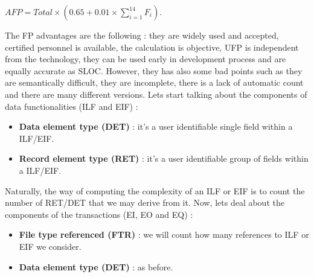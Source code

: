 \begin{center}
    $AFP = Total \times (0.65 + 0.01 \times \sum_{i=1}^{14} F_i)$.
\end{center}
The FP advantages are the following : they are widely used and accepted, certified personnel is available, the calculation is objective, UFP is independent from the technology, they can be used early in development process and are equally accurate as SLOC. However, they has also some bad points such as they are semantically difficult, they are incomplete, there is a lack of automatic count and there are many different versions. Lets start talking about the components of data functionalities (ILF and EIF) :
\begin{itemize}
    \item \textbf{Data element type (DET)} : it's a user identifiable single field within a ILF/EIF.
    \item \textbf{Record element type (RET)} : it's a user identifiable group of fields within a ILF/EIF.
\end{itemize}
Naturally, the way of computing the complexity of an ILF or EIF is to count the number of RET/DET that we may derive from it. Now, lets deal about the components of the transactions (EI, EO and EQ) :
\begin{itemize}
    \item \textbf{File type referenced (FTR)} : we will count how many references to ILF or EIF we consider.
    \item \textbf{Data element type (DET)} : as before.
\end{itemize}
